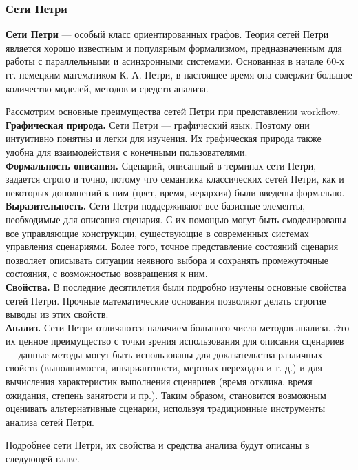 \documentclass[koi8-r,usehyperref,12pt]{G7-32}
\begin{document}
\subsubsection{Сети Петри}
\textbf{Сети Петри}  — особый класс ориентированных графов. Теория сетей Петри является хорошо известным и популярным формализмом, предназначенным для работы с параллельными и асинхронными системами. Основанная в начале 60-х гг. немецким математиком К. А. Петри, в настоящее время она содержит большое количество моделей, методов и средств анализа.

Рассмотрим основные преимущества сетей Петри при представлении
workflow.\\
\textbf{Графическая природа.} Сети Петри — графический язык. Поэтому они
интуитивно понятны и легки для изучения. Их графическая природа
также удобна для взаимодействия с конечными пользователями.\\ \textbf{Формальность описания.} Сценарий, описанный в терминах сети Петри, задается строго и точно, потому что семантика классических сетей Петри,
как и некоторых дополнений к ним (цвет, время, иерархия) были введены
формально.\\
\textbf{Выразительность.} Сети Петри поддерживают все базисные элементы, необходимые для описания сценария. С их помощью могут быть смоделированы все управляющие конструкции, существующие в современных системах управления сценариями. Более того, точное представление состояний
сценария позволяет описывать ситуации неявного выбора и сохранять
промежуточные состояния, с возможностью возвращения к ним.\\
\textbf{Свойства.} В последние десятилетия были подробно изучены основные свойства сетей Петри. Прочные математические основания позволяют делать строгие выводы из этих свойств.\\
\textbf{Анализ.} Сети Петри отличаются наличием большого числа методов анализа. Это их ценное преимущество с точки зрения использования для
описания сценариев — данные методы могут быть использованы для доказательства различных свойств (выполнимости, инвариантности, мертвых переходов и т. д.) и для вычисления характеристик выполнения сценариев (время отклика, время ожидания, степень занятости и пр.). Таким образом, становится возможным оценивать альтернативные сценарии, используя традиционные инструменты анализа сетей Петри.


Подробнее сети Петри, их свойства и средства анализа будут описаны в следующей главе.
\end{document}

